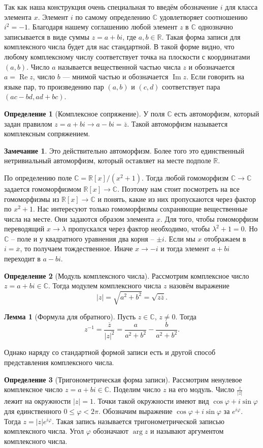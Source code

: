 \documentclass[10pt,a4paper,oneside]{book} %
\theoremstyle{definition}
\newtheorem*{rem}{Замечание}
\newtheorem*{defn}{Определение}
\newtheorem{lem}{Лемма}
\newcommand{\mb}[1]{\mathbb{#1}}
\newcommand{\ovl}{\overline}
\newcommand{\im}{\operatorname{Im}}
\newcommand{\re}{\operatorname{Re}}
\def\dfn{\begin{defn}}
\def\edfn{\end{defn}}
\def\lm{\begin{lem}}
\def\elm{\end{lem}}
\def\rm{\begin{rem}}
\def\erm{\end{rem}}
\begin{document}
Так как наша конструкция очень специальная то введём обозначение $i$ для класса элемента $x$. Элемент $i$ по самому определению $\mb C$ удовлетворяет соотношению $i^2=-1$. Благодаря нашему соглашению любой элемент $z$ в $\mb C$ однозначно записывается в виде суммы $z=a+bi$, где $a,b\in \mb R$. Такая форма записи для комплексного числа будет для нас стандартной. В такой форме видно, что любому комплексному числу соответствует точка на плоскости с координатами $(a,b)$. Число $a$ называется вещественной частью числа $z$ и обозначается $a=\re z$, число $b$ --- мнимой частью и обозначается $\im z$. Если говорить на языке пар, то произведению пар $(a,b)$ и $(c,d)$ соответствует пара $(ac-bd,ad+bc)$.
 
\dfn[Комплексное сопряжение] У поля $\mb C$ есть автоморфизм, который задан правилом $z=a+bi \to a-bi=\ovl{z}$. Такой автоморфизм называется комплексным сопряжением.
\edfn

\rm Это действительно автоморфизм. Более того это единственный нетривиальный автоморфизм, который оставляет на месте подполе $\mb R$.

\proof По определению поле $\mb C = \mb R[x]/(x^2+1)$. Тогда любой гомоморфизм $\mb C \to \mb C$ задается гомоморфизмом $\mb R[x]\to \mb C$. Поэтому нам стоит посмотреть на все гомоморфизмы из $\mb R[x]\to \mb C$ и понять, какие из них пропускаются через фактор по $x^2+1$. Нас интересуют только гомоморфизмы сохраняющие вещественные числа на месте. Они задаются образом элемента $x$. Для того, чтобы гомоморфизм переводящий $x \to \lambda$ пропускался через фактор необходимо, чтобы $\lambda^2+1=0$. Но $\mb C$ -- поле и у квадратного уравнения два корня -- $\pm i$. Если мы $x$ отображаем в $i=\ovl{x}$, то получаем тождественное. Иначе $x\to -i$ и тогда элемент $a+bi$ переходит в $a-bi$.
\endproof
\erm
 
\dfn[Модуль комплексного числа] Рассмотрим комплексное число $z=a+bi\in \mb C$. Тогда модулем комплексного числа $z$ назовём выражение
$$|z|=\sqrt{a^2+b^2}=\sqrt{z\ovl{z}}.$$
\edfn

\lm[Формула для обратного] Пусть $z\in \mb C$, $z\neq 0$. Тогда
$$ z^{-1} =\frac{\ovl{z}}{|z|^2}= \frac{a}{a^2+b^2}-\frac{b}{a^2+b^2}.$$
\elm

Однако наряду со стандартной формой записи есть и другой способ представления комплексного числа.

\dfn[Тригонометрическая форма записи] Рассмотрим ненулевое комплексное число $z= a+bi\in\mb C$. Поделим число $z$ на его модуль. Число
$\frac{z}{|z|}$ лежит на окружности $|z| = 1$. Точки такой окружности имеют вид $\cos\varphi +i\sin\varphi$ для единственного $0 \leq \varphi < 2\pi$. Обозначим выражение $\cos\varphi+i\sin\varphi$ за $e^{i\varphi}$. Тогда $z=|z|e^{i\varphi}$.
Такая запись называется тригонометрической записью комплексного числа. Угол $\varphi$ обозначают $\arg z$ и называют
аргументом комплексного числа.
\edfn
\end{document}
